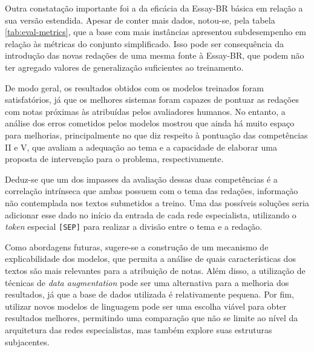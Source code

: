 Outra constatação importante foi a da eficácia da Essay-BR básica em relação a sua versão estendida. Apesar de conter mais dados, notou-se, pela tabela \ref{tab:eval-metrics}, que a base com mais instâncias apresentou subdesempenho em relação às métricas do conjunto simplificado. Isso pode ser consequência da introdução das novas redações de uma mesma fonte à Essay-BR, que podem não ter agregado valores de generalização suficientes ao treinamento.

De modo geral, os resultados obtidos com os modelos treinados foram satisfatórios, já que os melhores sistemas foram capazes de pontuar as redações com notas próximas às atribuídas pelos avaliadores humanos. No entanto, a análise dos erros cometidos pelos modelos mostrou que ainda há muito espaço para melhorias, principalmente no que diz respeito à pontuação das competências II e V, que avaliam a adequação ao tema e a capacidade de elaborar uma proposta de intervenção para o problema, respectivamente.

Deduz-se que um dos impasses da avaliação dessas duas competências é a correlação intrínseca que ambas possuem com o tema das redações, informação não contemplada nos textos submetidos a treino. Uma das possíveis soluções seria adicionar esse dado no início da entrada de cada rede especialista, utilizando o \textit{token} especial \texttt{[SEP]} para realizar a divisão entre o tema e a redação.

Como abordagens futuras, sugere-se a construção de um mecanismo de explicabilidade dos modelos, que permita a análise de quais características dos textos são mais relevantes para a atribuição de notas. Além disso, a utilização de técnicas de \textit{data augmentation} pode ser uma alternativa para a melhoria dos resultados, já que a base de dados utilizada é relativamente pequena. Por fim, utilizar novos modelos de linguagem pode ser uma escolha viável para obter resultados melhores, permitindo uma comparação que não se limite ao nível da arquitetura das redes especialistas, mas também explore suas estruturas subjacentes.
